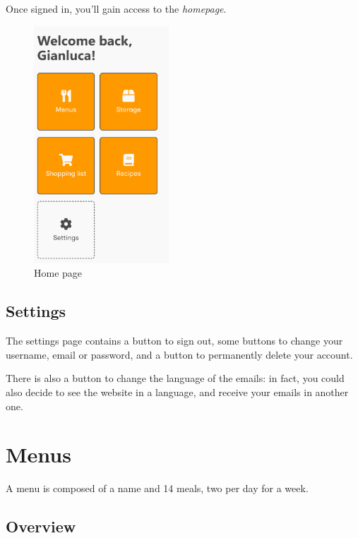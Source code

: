 \documentclass[12pt, a4paper]{report}
\begin{document}
    Once signed in, you'll gain access to the \emph{homepage}.

    \begin{figure}[H]
        \centering
        \includegraphics[width=0.45\textwidth]{assets/en/home.png}
        \caption{Home page}
    \end{figure}

    \section{Settings}

    The settings page contains a button to sign out, some buttons to change your username, email or password, and a button to permanently delete your
    account.

    There is also a button to change the language of the emails: in fact, you could also decide to see the website in a language, and receive your
    emails in another one.



    \chapter{Menus}

    A menu is composed of a name and 14 meals, two per day for a week.

    \section{Overview}
\end{document}
